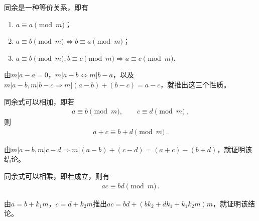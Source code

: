 \begin{theorem}\label{theorem:7.ex02.20}
    同余是一种等价关系，即有
    \begin{enumerate}
        \item $a\equiv a\pmod{m}$；
        \item $a\equiv b\pmod{m} \Leftrightarrow b\equiv a\pmod{m}$；
        \item $a\equiv b\pmod{m}, b\equiv c\pmod{m} \Rightarrow a\equiv c\pmod{m}$.
    \end{enumerate}
\end{theorem}
\begin{prove}
    由$m|a-a=0$，$m|a-b\Leftrightarrow m|b-a$，以及
    $m|a-b,m|b-c\Rightarrow m|(a-b)+(b-c)=a-c$，就推出这三个性质。
\end{prove}
\begin{theorem}\label{theorem:7.ex02.21}
    同余式可以相加，即若
    \begin{align}\label{eq:7.ex02.addcongruent}
        a\equiv b\pmod{m},\qquad c\equiv d\pmod{m}\, ,
    \end{align}
    则
    \begin{align}
        a+c\equiv b+d\pmod{m}\, .
    \end{align}
\end{theorem}
\begin{prove}
    由$m|a-b,m|c-d\Rightarrow m|(a-b)+(c-d)=(a+c)-(b+d)$，就证明该结论。
\end{prove}
\begin{theorem}\label{theorem:7.ex02.22}
    同余式可以相乘，即若成立，则有
    \begin{align}
        ac\equiv bd\pmod{m}\, .
    \end{align}
\end{theorem}
\begin{prove}
    由$a=b+k_1m$，$c=d+k_2m$推出$ac=bd+(bk_2+dk_1+k_1k_2m)m$，就证明该结论。
\end{prove}

